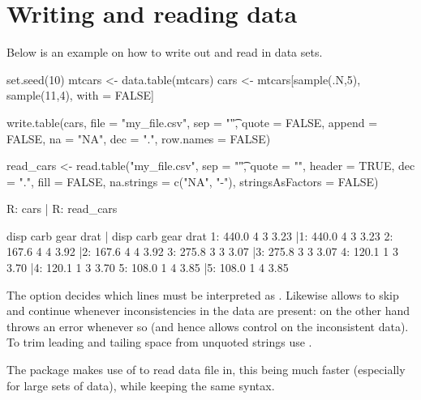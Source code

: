 \section{Writing and reading data}\label{sec: read_write}
Below is an example on how to write out and read 
in data sets. 
\begin{example}
set.seed(10)
mtcars <- data.table(mtcars)
cars   <- mtcars[sample(.N,5), sample(11,4), with = FALSE]

write.table(cars, file = "my_file.csv", sep = "\t", 
            quote = FALSE, append = FALSE, na = "NA", 
            dec = ".", row.names = FALSE)

read_cars <- read.table("my_file.csv", sep = "\t", quote = "",
                        header = TRUE, dec = ".", fill = FALSE, 
                        na.strings = c("NA", "-"), 
                        stringsAsFactors = FALSE)
                        
R: cars                  | R: read_cars

    disp carb gear drat  |    disp carb gear drat
1: 440.0    4    3 3.23  |1: 440.0    4    3 3.23
2: 167.6    4    4 3.92  |2: 167.6    4    4 3.92
3: 275.8    3    3 3.07  |3: 275.8    3    3 3.07
4: 120.1    1    3 3.70  |4: 120.1    1    3 3.70
5: 108.0    1    4 3.85  |5: 108.0    1    4 3.85        
\end{example}
The option  decides
which lines must be interpreted as . 
Likewise  allows to skip and 
continue whenever inconsistencies in the data are
present: on the other hand  
throws an error whenever so (and hence allows 
control on the inconsistent data). To trim leading 
and tailing space from unquoted strings use 
.
\bigskip

The  package makes use of 
 to read data file in, this being
much faster (especially for large sets of data),
while keeping the same syntax.
